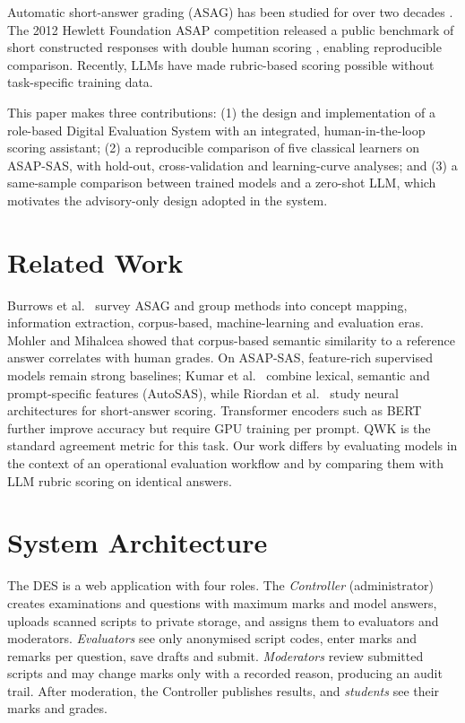 \documentclass[conference]{IEEEtran}
\begin{document}
Automatic short-answer grading (ASAG) has been studied for over two decades \cite{burrows2015}. The 2012 Hewlett Foundation ASAP competition released a public benchmark of short constructed responses with double human scoring \cite{shermis2014}, enabling reproducible comparison. Recently, LLMs have made rubric-based scoring possible without task-specific training data.

This paper makes three contributions: (1) the design and implementation of a role-based Digital Evaluation System with an integrated, human-in-the-loop scoring assistant; (2) a reproducible comparison of five classical learners on ASAP-SAS, with hold-out, cross-validation and learning-curve analyses; and (3) a same-sample comparison between trained models and a zero-shot LLM, which motivates the advisory-only design adopted in the system.

\section{Related Work}
Burrows et al.\ \cite{burrows2015} survey ASAG and group methods into concept mapping, information extraction, corpus-based, machine-learning and evaluation eras. Mohler and Mihalcea \cite{mohler2009} showed that corpus-based semantic similarity to a reference answer correlates with human grades. On ASAP-SAS, feature-rich supervised models remain strong baselines; Kumar et al.\ \cite{kumar2019} combine lexical, semantic and prompt-specific features (AutoSAS), while Riordan et al.\ \cite{riordan2017} study neural architectures for short-answer scoring. Transformer encoders such as BERT \cite{devlin2019} further improve accuracy but require GPU training per prompt. QWK \cite{cohen1968} is the standard agreement metric for this task. Our work differs by evaluating models in the context of an operational evaluation workflow and by comparing them with LLM rubric scoring on identical answers.

\section{System Architecture}
The DES is a web application with four roles. The \emph{Controller} (administrator) creates examinations and questions with maximum marks and model answers, uploads scanned scripts to private storage, and assigns them to evaluators and moderators. \emph{Evaluators} see only anonymised script codes, enter marks and remarks per question, save drafts and submit. \emph{Moderators} review submitted scripts and may change marks only with a recorded reason, producing an audit trail. After moderation, the Controller publishes results, and \emph{students} see their marks and grades.
\end{document}
